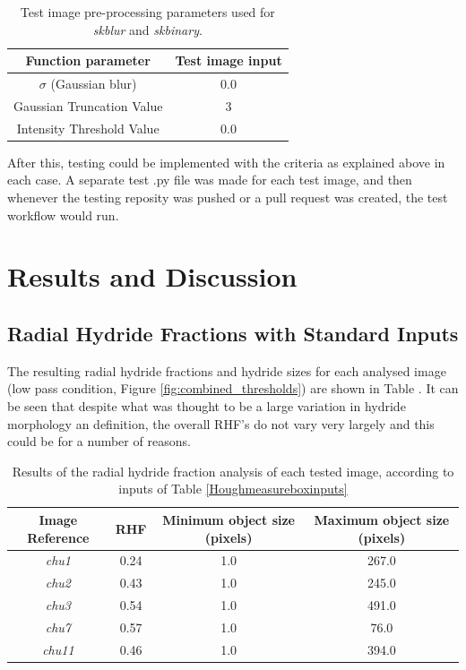 \documentclass{article}
\begin{document}
    \begin{table}[h]
        \centering
        \begin{tabular}{|c|c|}
        \hline
            \textbf{Function parameter} & \textbf{Test image input}  \\
            \hline
            $\sigma$ (Gaussian blur) & 0.0 \\
            \hline
            Gaussian Truncation Value & 3 \\
            \hline
            Intensity Threshold Value & 0.0 \\ 
        \hline
        \end{tabular}
    \caption{Test image pre-processing parameters used for \textit{skblur} and \textit{skbinary}.}
    \label{tab:TestImageTable}
    \end{table}

    After this, testing could be implemented with the criteria as explained above in each case. A separate test .py file was made for each test image, and then whenever the testing reposity was pushed or a pull request was created, the test workflow would run.

\section{Results and Discussion}
\subsection{Radial Hydride Fractions with Standard Inputs}
    The resulting radial hydride fractions and hydride sizes for each analysed image (low pass condition, Figure \ref{fig:combined_thresholds}) are shown in Table . It can be seen that despite what was thought to be a large variation in hydride morphology an definition, the overall RHF's do not vary very largely and this could be for a number of reasons.

    \begin{table}[ht]
	    \begin{center}
	    \begin{tabular}{ |c|c|c|c| } 
		    \hline
		    \textbf{Image Reference} & \textbf{RHF} & \textbf{Minimum object size (pixels)} & \textbf{Maximum object size (pixels)} \\
		    \hline
		    \textit{chu1} & 0.24 & 1.0 & 267.0 \\
		    \hline
		    \textit{chu2} & 0.43 & 1.0 & 245.0 \\
		    \hline
		    \textit{chu3} & 0.54 & 1.0 & 491.0 \\ 
		    \hline
		    \textit{chu7} & 0.57 & 1.0 & 76.0 \\ 
		    \hline
		    \textit{chu11} & 0.46 & 1.0 & 394.0 \\ 
		    \hline
	    \end{tabular}
	    \caption{Results of the radial hydride fraction analysis of each tested image, according to inputs of Table \ref{Houghmeasureboxinputs}}
	    \end{center}
	    \label{tab:RHF_results}
    \end{table}
\end{document}
